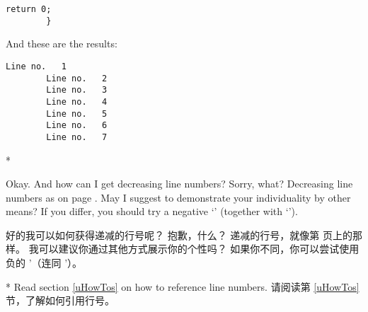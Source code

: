 \begin{paracol}{2}
\begin{lstsample}[name]{\lstset{numbers=left,numberstyle=\tiny,stepnumber=1,numbersep=5pt}}{}
\begin{lstlisting}[name=Test,
            language={[ansi]C},
            linerange={1-4,6-7,10-14,
            17-19,21-22},
            firstnumber=1]
            return 0;
        }

        \end{lstlisting}
        And these are the results:
        \begin{lstlisting}[language={},
            linerange={1-2,6-7},
            consecutivenumbers=false]
        Line no.   1
        Line no.   2
        Line no.   3
        Line no.   4
        Line no.   5
        Line no.   6
        Line no.   7
        \end{lstlisting}
\end{lstsample}

\switchcolumn[0]*%
\begin{advise}
\item Okay. And how can I get decreasing line numbers?
    \advisespace
    Sorry, what?
    \advisespace
    Decreasing line numbers as on page \pageref{rDecreasingLabels}.
    \advisespace
    May I suggest to demonstrate your individuality by other means?
    If you differ, you should try a negative `'
    (together with `').
\end{advise}
\switchcolumn
\begin{advise}
\item 好的我可以如何获得递减的行号呢？
\advisespace
抱歉，什么？
\advisespace
递减的行号，就像第 \pageref{rDecreasingLabels} 页上的那样。
\advisespace
我可以建议你通过其他方式展示你的个性吗？
如果你不同，你可以尝试使用负的 '（连同 '）。
\end{advise}
\switchcolumn[0]*%
Read section \ref{uHowTos} on how to reference line numbers.
\switchcolumn
请阅读第 \ref{uHowTos} 节，了解如何引用行号。
\end{paracol}
